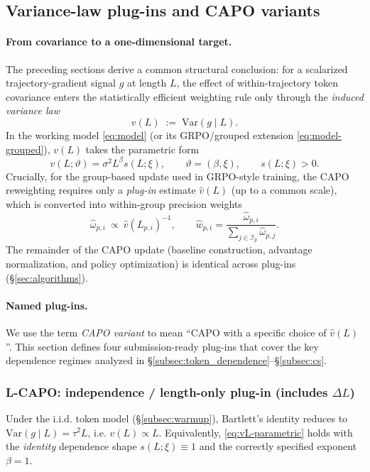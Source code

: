 \subsection{Variance-law plug-ins and CAPO variants}\label{subsec:capo-plugins}

\paragraph{From covariance to a one-dimensional target.}
The preceding sections derive a common structural conclusion: for a scalarized trajectory-gradient signal $g$ at length $L$, the effect of within-trajectory token covariance enters the statistically efficient weighting rule only through the \emph{induced variance law}
\begin{equation}
\label{eq:induced-variance-law}
v(L)\;:=\;\mathrm{Var}(g\mid L).
\end{equation}
In the working model \eqref{eq:model} (or its GRPO/grouped extension \eqref{eq:model-grouped}), $v(L)$ takes the parametric form
\begin{equation}
\label{eq:vL-parametric}
v(L;\vartheta)=\sigma^2 L^{\beta}s(L;\xi),\qquad \vartheta=(\beta,\xi),\qquad s(L;\xi)>0.
\end{equation}
Crucially, for the group-based update used in GRPO-style training, the CAPO reweighting requires only a \emph{plug-in} estimate $\widehat v(L)$ (up to a common scale), which is converted into within-group precision weights
\begin{equation}
\label{eq:plugin-weights}
\widehat\omega_{p,i}\ \propto\ \widehat v(L_{p,i})^{-1},
\qquad
\widehat w_{p,i}=\frac{\widehat\omega_{p,i}}{\sum_{j\in\mathcal I_p}\widehat\omega_{p,j}}.
\end{equation}
The remainder of the CAPO update (baseline construction, advantage normalization, and policy optimization) is identical across plug-ins (\S\ref{sec:algorithms}).

\paragraph{Named plug-ins.}
We use the term \emph{CAPO variant} to mean ``CAPO with a specific choice of $\widehat v(L)$''. This section defines four submission-ready plug-ins that cover the key dependence regimes analyzed in \S\ref{subsec:token_dependence}--\S\ref{subsec:cs}.

\subsubsection{L-CAPO: independence / length-only plug-in (includes $\Delta L$)}\label{subsec:l-capo-plugin}
Under the i.i.d. token model (\S\ref{subsec:warmup}), Bartlett’s identity reduces to $\mathrm{Var}(g\mid L)=\tau^2 L$, i.e. $v(L)\propto L$. Equivalently, \eqref{eq:vL-parametric} holds with the \emph{identity} dependence shape $s(L;\xi)\equiv 1$ and the correctly specified exponent $\beta=1$.

